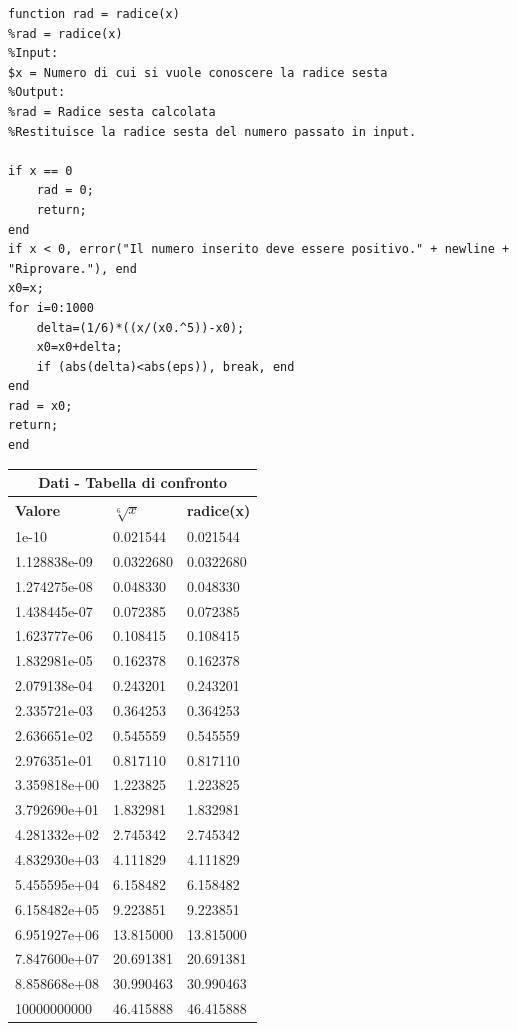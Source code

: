 \documentclass[10pt,a4paper]{article}
\begin{document}
\begin{lstlisting}[style=Matlab-editor]
function rad = radice(x)
%rad = radice(x)
%Input: 
$x = Numero di cui si vuole conoscere la radice sesta
%Output:
%rad = Radice sesta calcolata
%Restituisce la radice sesta del numero passato in input.
  
if x == 0
    rad = 0;
    return;
end
if x < 0, error("Il numero inserito deve essere positivo." + newline + "Riprovare."), end
x0=x;
for i=0:1000
    delta=(1/6)*((x/(x0.^5))-x0);
    x0=x0+delta;
    if (abs(delta)<abs(eps)), break, end 
end
rad = x0;
return;
end
\end{lstlisting}
\begin{center}
  \begin{tabular}{ |p{2.7cm}|p{2.7cm}|p{2.7cm}| }
    \hline
    \multicolumn{3}{|c|}{ \textbf{Dati - Tabella di confronto}} \\
    \hline
    \textbf{Valore} & $ \sqrt[6]{x} $ & \textbf{radice(x)}      \\
    \hline
    1e-10           & 0.021544        & 0.021544                \\
    1.128838e-09    & 0.0322680       & 0.0322680               \\
    1.274275e-08    & 0.048330        & 0.048330                \\
    1.438445e-07    & 0.072385        & 0.072385                \\
    1.623777e-06    & 0.108415        & 0.108415                \\
    1.832981e-05    & 0.162378        & 0.162378                \\
    2.079138e-04    & 0.243201        & 0.243201                \\
    2.335721e-03    & 0.364253        & 0.364253                \\
    2.636651e-02    & 0.545559        & 0.545559                \\
    2.976351e-01    & 0.817110        & 0.817110                \\
    3.359818e+00    & 1.223825        & 1.223825                \\
    3.792690e+01    & 1.832981        & 1.832981                \\
    4.281332e+02    & 2.745342        & 2.745342                \\
    4.832930e+03    & 4.111829        & 4.111829                \\
    5.455595e+04    & 6.158482        & 6.158482                \\
    6.158482e+05    & 9.223851        & 9.223851                \\
    6.951927e+06    & 13.815000       & 13.815000               \\
    7.847600e+07    & 20.691381       & 20.691381               \\
    8.858668e+08    & 30.990463       & 30.990463               \\
    10000000000     & 46.415888       & 46.415888               \\
    \hline
  \end{tabular}
\end{center}
\end{document}
